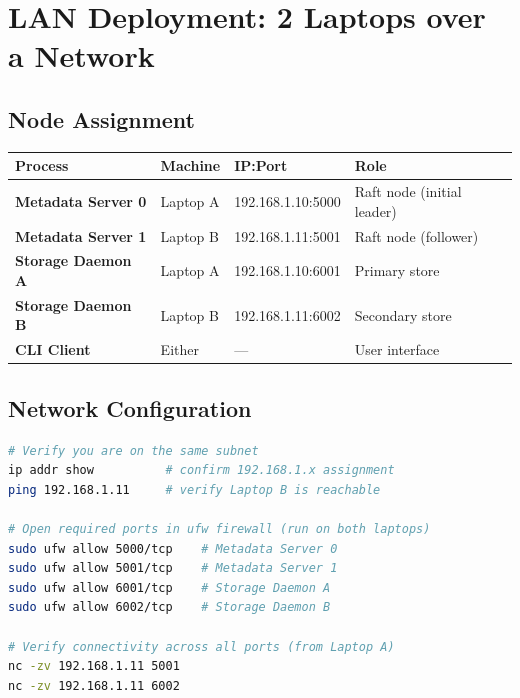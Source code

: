 \documentclass[12pt,a4paper]{article}
\begin{document}
\section{LAN Deployment: 2 Laptops over a Network}

\subsection{Node Assignment}

\begin{center}
\begin{tabular}{>{\bfseries}p{3cm} p{3cm} p{4cm} p{3.5cm}}
\toprule
Process & Machine & IP:Port & Role \\
\midrule
Metadata Server 0 & Laptop A & 192.168.1.10:5000 & Raft node (initial leader) \\
Metadata Server 1 & Laptop B & 192.168.1.11:5001 & Raft node (follower) \\
Storage Daemon A  & Laptop A & 192.168.1.10:6001 & Primary store \\
Storage Daemon B  & Laptop B & 192.168.1.11:6002 & Secondary store \\
CLI Client        & Either   & —                 & User interface \\
\bottomrule
\end{tabular}
\end{center}

\subsection{Network Configuration}

\begin{lstlisting}[language=bash, caption={LAN setup on Laptop A (Ubuntu)}]
# Verify you are on the same subnet
ip addr show          # confirm 192.168.1.x assignment
ping 192.168.1.11     # verify Laptop B is reachable

# Open required ports in ufw firewall (run on both laptops)
sudo ufw allow 5000/tcp    # Metadata Server 0
sudo ufw allow 5001/tcp    # Metadata Server 1
sudo ufw allow 6001/tcp    # Storage Daemon A
sudo ufw allow 6002/tcp    # Storage Daemon B

# Verify connectivity across all ports (from Laptop A)
nc -zv 192.168.1.11 5001
nc -zv 192.168.1.11 6002
\end{lstlisting}
\end{document}
